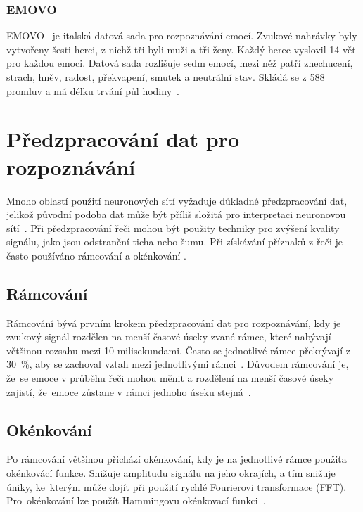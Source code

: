 \documentclass[FM,BP]{tulthesis}
\begin{document}
\subsection{EMOVO} \label{desc/emovo} %
EMOVO~\cite{DBLP:conf/lrec/CostantiniIPT14} je italská datová sada pro rozpoznávání emocí. Zvukové nahrávky byly vytvořeny šesti herci, z nichž tři byli muži a tři ženy. Každý herec vyslovil 14 vět pro každou emoci. Datová sada rozlišuje sedm emocí, mezi něž patří znechucení, strach, hněv, radost, překvapení, smutek a neutrální stav. Skládá se z 588 promluv a má délku trvání půl hodiny~\cite{DBLP:conf/lrec/CostantiniIPT14}.

\chapter{Předzpracování dat pro rozpoznávání} %
Mnoho oblastí použití neuronových sítí vyžaduje důkladné předzpracování dat, jelikož původní podoba dat může být příliš složitá pro interpretaci neuronovou sítí~\cite{goodfellow2016deep}. Při předzpracování řeči mohou být použity techniky pro zvýšení kvality signálu, jako jsou odstranění ticha nebo šumu. Při získávání příznaků z řeči je často používáno rámcování a okénkování \cite{konar_chakraborty_2015}.

\section{Rámcování} %
Rámcování bývá prvním krokem předzpracování dat pro rozpoznávání, kdy je zvukový signál rozdělen na menší časové úseky zvané rámce, které nabývají většinou rozsahu mezi 10 milisekundami. Často se jednotlivé rámce překrývají z \mbox{30 \%}, aby se zachoval vztah mezi jednotlivými rámci~\cite{DBLP:journals/speech/AkcayO20}. Důvodem rámcování je, že~se emoce v průběhu řeči mohou měnit a rozdělení na menší časové úseky zajistí, že~emoce zůstane v rámci jednoho úseku stejná~\cite{konar_chakraborty_2015}.

\section{Okénkování} %
Po rámcování většinou přichází okénkování, kdy je na jednotlivé rámce použita okénkovácí funkce. Snižuje amplitudu signálu na jeho okrajích, a tím snižuje úniky, ke~kterým může dojít při použití rychlé Fourierovi transformace (FFT). Pro~okénkování lze použít Hammingovu okénkovací funkci~\cite{DBLP:journals/speech/AkcayO20}.
\end{document}

